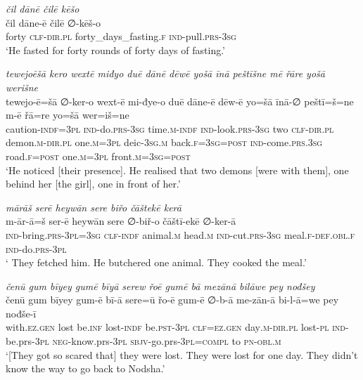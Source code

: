 \ea \label{ŽP.140}
\textit{čil dānē čilē kēšo} \\ 
\gll čil dāne-ē čilē ∅-kēš-o \\ 
 forty \textsc{clf}\textsc{-dir}\textsc{.pl} forty\_days\_fasting\textsc{.f} \textsc{ind-}pull\textsc{.prs}\textsc{-3sg} \\ 
\glt `He fasted for forty rounds of forty days of fasting.'
\z 
 
\ea \label{ŽP.176}
\textit{tewejoēšā kero wextē miđyo duē dānē dēwē yošā īnā peštīšne mē řāre yošā werišne} \\ 
\gll tewejo-ē=šā ∅-ker-o wext-ē mi-đye-o duē dāne-ē dēw-ē yo=šā īnā-∅ peštī=š=ne m-ē řā=re yo=šā wer=iš=ne \\ 
 caution\textsc{-indf}\textsc{=3pl} \textsc{ind-}do\textsc{.prs}\textsc{-3sg} time\textsc{.m}\textsc{-indf} \textsc{ind-}look\textsc{.prs}\textsc{-3sg} two \textsc{clf}\textsc{-dir}\textsc{.pl} demon\textsc{.m}\textsc{-dir}\textsc{.pl} one\textsc{.m}\textsc{=3pl} deic\textsc{-3sg}\textsc{.m} back\textsc{.f}\textsc{=3sg}\textsc{=\textsc{post}} \textsc{ind-}come\textsc{.prs}\textsc{.3sg} road\textsc{.f}\textsc{=\textsc{post}} one\textsc{.m}\textsc{=3pl} front\textsc{.m}\textsc{=3sg}\textsc{=\textsc{post}} \\ 
\glt `He noticed [their presence]. He realised that two demons [were with them], one behind her [the girl], one in front of her.'
\z 
 
\ea \label{ŽP.253}
\textit{mārāš serē heywān sere biřo čāštekē kerā} \\ 
\gll m-ār-ā=š ser-ē heywān sere ∅-biř-o čāštī-ekē ∅-ker-ā \\ 
 \textsc{ind-}bring\textsc{.prs}\textsc{-3pl}\textsc{=3sg} \textsc{clf}\textsc{-indf} animal\textsc{.m} head\textsc{.m} \textsc{ind-}cut\textsc{.prs}\textsc{-3sg} meal\textsc{.f}\textsc{-def}\textsc{.obl}\textsc{.f} \textsc{ind-}do\textsc{.prs}\textsc{-3pl} \\ 
\glt ` They fetched him. He butchered one animal. They cooked the meal.'
\z 
 
\ea \label{ŠJ.39}
\textit{čenū gum bīyey gumē bīyā serew řoē gumē bā mezānā bilāwe pey nođšey} \\ 
\gll čenū gum bīyey gum-ē bī-ā sere=ū řo-ē gum-ē ∅-b-ā me-zān-ā bi-l-ā=we pey nođše-ī \\ 
 with\textsc{.ez.gen} lost be\textsc{.inf} lost\textsc{-indf} be\textsc{.pst}\textsc{-3pl} \textsc{clf}\textsc{=ez.gen} day\textsc{.m}\textsc{-dir}\textsc{.pl} lost\textsc{\textsc{-pl}} \textsc{ind-}be.prs\textsc{-3pl} \textsc{neg-}know.prs\textsc{-3pl} \textsc{sbjv-}go.prs\textsc{-3pl}\textsc{=compl} to \textsc{pn}\textsc{-obl}\textsc{.m} \\ 
\glt `[They got so scared that] they were lost. They were lost for one day. They didn’t know the way to go back to Nodsha.'
\z 
 
